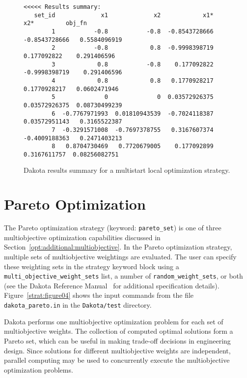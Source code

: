 \begin{figure}
\centering
\begin{bigbox}
\begin{footnotesize}
\begin{verbatim}
<<<<< Results summary:
   set_id             x1             x2            x1*            x2*         obj_fn 
        1           -0.8           -0.8  -0.8543728666  -0.8543728666   0.5584096919 
        2           -0.8            0.8  -0.9998398719    0.177092822    0.291406596 
        3            0.8           -0.8    0.177092822  -0.9998398719    0.291406596 
        4            0.8            0.8   0.1770928217   0.1770928217   0.0602471946 
        5              0              0  0.03572926375  0.03572926375  0.08730499239 
        6  -0.7767971993  0.01810943539  -0.7024118387  0.03572951143   0.3165522387 
        7  -0.3291571008  -0.7697378755   0.3167607374  -0.4009188363   0.2471403213 
        8   0.8704730469   0.7720679005    0.177092899   0.3167611757  0.08256082751 
\end{verbatim}
\end{footnotesize}
\end{bigbox}
\caption{Dakota results summary for a multistart local optimization strategy.}
\label{strat:figure03}
\end{figure}

\section{Pareto Optimization}\label{strat:pareto}

The Pareto optimization strategy (keyword: \texttt{pareto\_set}) is
one of three multiobjective optimization capabilities discussed in
Section~\ref{opt:additional:multiobjective}. In the Pareto
optimization strategy, multiple sets of multiobjective weightings are
evaluated. The user can specify these weighting sets in the strategy
keyword block using a \texttt{multi\_objective\_weight\_sets} list, a
number of \texttt{random\_weight\_sets}, or both (see the Dakota
Reference Manual~\cite{RefMan} for additional specification details).
Figure~\ref{strat:figure04} shows the input commands from the file
\texttt{dakota\_pareto.in} in the \texttt{Dakota/test} directory.

Dakota performs one multiobjective optimization problem for each set
of multiobjective weights. The collection of computed optimal
solutions form a Pareto set, which can be useful in making trade-off
decisions in engineering design. Since solutions for different
multiobjective weights are independent, parallel computing may be used
to concurrently execute the multiobjective optimization problems.

